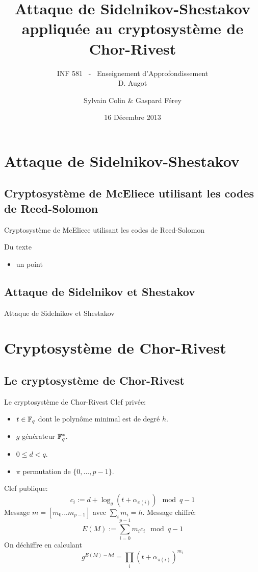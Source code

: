 \documentclass[]{beamer}
\title[Attaque de Chor-Rivest]{Attaque de Sidelnikov-Shestakov appliquée au cryptosystème de Chor-Rivest }
\subtitle{INF 581 \ - \ Enseignement d'Approfondissement \\ D. Augot}
\author[S. Colin \& G. Férey]{Sylvain Colin \& Gaspard Férey}
\institute[X 2011]{Département d'Informatique\\ Ecole Polytechnique, France }
\date{16 Décembre 2013}
\begin{document}
\begin{frame}[plain]
  \titlepage
\end{frame}


\section{Attaque de Sidelnikov-Shestakov}

\subsection{Cryptosystème de McEliece utilisant les codes de Reed-Solomon}

\begin{frame}{Cryptosystème de McEliece utilisant les codes de Reed-Solomon}

Du texte
\begin{itemize}
\item un point
\end{itemize}

\end{frame}


\subsection{Attaque de Sidelnikov et Shestakov}

\begin{frame}{Attaque de Sidelnikov et Shestakov}

\end{frame}



\section{Cryptosystème de Chor-Rivest}


\subsection{Le cryptosystème de Chor-Rivest}
\begin{frame}{Le cryptosystème de Chor-Rivest}
Clef privée:
\begin{itemize}
\item $t \in \mathbb{F}_q$ dont le polynôme minimal est de degré $h$.
\item $g$ générateur $\mathbb{F}_q^*$.
\item $0 \leq d < q$.
\item $\pi$ permutation de $\{ 0, ... , p-1 \}$.
\end{itemize}
Clef publique:
$$ c_i := d + \log_g(t + \alpha_{\pi(i)}) \mod q-1 $$
Message $m = [m_0...m_{p-1}]$ avec $\sum_i m_i = h$.
Message chiffré:
$$ E(M) := \sum_{i=0}^{p-1} m_i c_i \mod q-1 $$
On déchiffre en calculant
$$ g^{E(M) - hd} =  \prod_i \left( t + \alpha_{\pi(i)}\right)^{m_i} $$
\end{frame}
\end{document}

